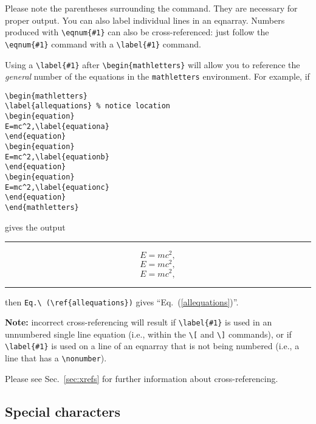 \smallskip

Please note the parentheses surrounding the command. They are necessary for
proper output. You can also label individual lines in an eqnarray. Numbers
produced with \verb+\eqnum{#1}+ can also be cross-referenced: just follow
the \verb+\eqnum{#1}+ command with a \verb+\label{#1}+ command.

Using a \verb+\label{#1}+ after \verb+\begin{mathletters}+ will allow you
to reference the {\em general\/} number of the equations in the
\verb+mathletters+ environment. For example, if
\begin{verbatim}
\begin{mathletters}
\label{allequations} % notice location
\begin{equation}
E=mc^2,\label{equationa}
\end{equation}
\begin{equation}
E=mc^2,\label{equationb}
\end{equation}
\begin{equation}
E=mc^2,\label{equationc}
\end{equation}
\end{mathletters}
\end{verbatim}

\noindent
gives the output
\smallskip\hrule\smallskip
\begin{mathletters}
\label{allequations}
\begin{equation}
E=mc^2,\label{equationa}
\end{equation}
\begin{equation}
E=mc^2,\label{equationb}
\end{equation}
\begin{equation}
E=mc^2,\label{equationc}
\end{equation}
\end{mathletters}
\smallskip\hrule\smallskip
\noindent
then \verb+Eq.\ (\ref{allequations})+ gives ``Eq.\ (\ref{allequations})''.

{\bf Note:} incorrect cross-referencing will result if \verb+\label{#1}+ is
used in an unnumbered single line equation (i.e., within the \verb+\[+ and
\verb+\]+ commands), or if \verb+\label{#1}+ is used on a line of an
eqnarray that is not being numbered (i.e., a line that has a
\verb+\nonumber+).

Please see Sec.\ \ref{sec:xrefs} for further information about
cross-referencing.

\subsection{Special characters}

